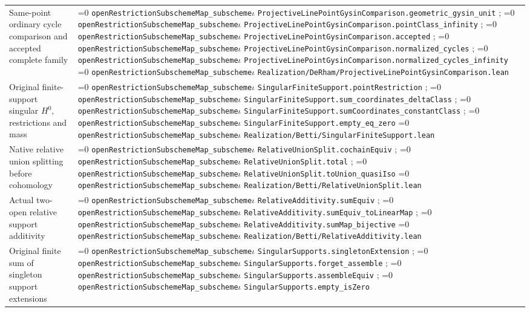 \documentclass[11pt]{article}
\theoremstyle{definition}
\theoremstyle{remark}
\newcommand{\leanpath}[1]{%
  \ifnum\pdfstrcmp{\detokenize{#1}}%
      {\detokenize{openRestrictionSubschemeMap_subschemeι}}=0
    \texttt{\nolinkurl{openRestrictionSubschemeMap_subscheme}}\ensuremath{\iota}%
  \else
    \texttt{\nolinkurl{#1}}%
  \fi}
\begin{document}
\begin{longtable}{@{}>{\raggedright\arraybackslash}p{}
                >{\raggedright\arraybackslash}p{}@{}}
Same-point ordinary cycle comparison and accepted complete family &
\leanpath{ProjectiveLinePointGysinComparison.geometric_gysin_unit};\newline
\leanpath{ProjectiveLinePointGysinComparison.pointClass_infinity};\newline
\leanpath{ProjectiveLinePointGysinComparison.accepted};\newline
\leanpath{ProjectiveLinePointGysinComparison.normalized_cycles};\newline
{\footnotesize\leanpath{ProjectiveLinePointGysinComparison.normalized_cycles_infinity}}\newline
\leanpath{Realization/DeRham/ProjectiveLinePointGysinComparison.lean}\\
Original finite-support singular \(H^0\), restrictions and mass &
\leanpath{SingularFiniteSupport.pointRestriction};\newline
\leanpath{SingularFiniteSupport.sum_coordinates_deltaClass};\newline
\leanpath{SingularFiniteSupport.sumCoordinates_constantClass};\newline
\leanpath{SingularFiniteSupport.empty_eq_zero}\newline
\leanpath{Realization/Betti/SingularFiniteSupport.lean}\\
Native relative union splitting before cohomology &
\leanpath{RelativeUnionSplit.cochainEquiv};\newline
\leanpath{RelativeUnionSplit.total};\newline
\leanpath{RelativeUnionSplit.toUnion_quasiIso}\newline
\leanpath{Realization/Betti/RelativeUnionSplit.lean}\\
Actual two-open relative support additivity &
\leanpath{RelativeAdditivity.sumEquiv};\newline
\leanpath{RelativeAdditivity.sumEquiv_toLinearMap};\newline
\leanpath{RelativeAdditivity.sumMap_bijective}\newline
\leanpath{Realization/Betti/RelativeAdditivity.lean}\\
Original finite sum of singleton support extensions &
\leanpath{SingularSupports.singletonExtension};\newline
\leanpath{SingularSupports.forget_assemble};\newline
\leanpath{SingularSupports.assembleEquiv};\newline
\leanpath{SingularSupports.empty_isZero}\newline

\end{longtable}
\end{document}

